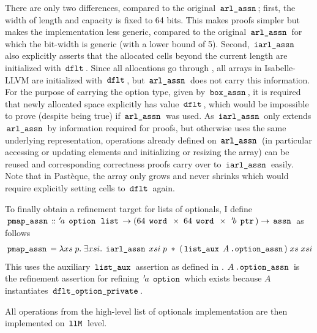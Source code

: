 There are only two differences, compared to the original $\,\text{\ttfamily arl\_assn}\,$; first, the width of length and capacity is fixed to 64 bits.
This makes proofs simpler but makes the implementation less generic, compared to the original $\,\text{\ttfamily arl\_assn}\,$ for which the bit-width is generic (with a lower bound of 5).
Second, $\,\text{\ttfamily iarl\_assn}\,$ also explicitly asserts that the allocated cells beyond the current length are initialized with $\,\text{\ttfamily dflt}\,$.
Since all allocations go through , all arrays in Isabelle-LLVM are initialized with $\,\text{\ttfamily dflt}\,$, but $\,\text{\ttfamily arl\_assn}\,$ does not carry this information.
For the purpose of carrying the option type, given by $\,\text{\ttfamily box\_assn}\,$, it is required that newly allocated space explicitly has value $\,\text{\ttfamily dflt}\,$, which would be impossible to prove (despite being true) if $\,\text{\ttfamily arl\_assn}\,$ was used.
As $\,\text{\ttfamily iarl\_assn}\,$ only extends $\,\text{\ttfamily arl\_assn}\,$ by information required for proofs, but otherwise uses the same underlying representation, operations already defined on $\,\text{\ttfamily arl\_assn}\,$ (in particular accessing or updating elements and initializing or resizing the array) can be reused and corresponding correctness proofs carry over to $\,\text{\ttfamily iarl\_assn}\,$ easily.
Note that in Pastèque, the array only grows and never shrinks which would require explicitly setting cells to $\,\text{\ttfamily dflt}\,$ again.

To finally obtain a refinement target for lists of optionals, I define $\,\text{\ttfamily pmap\_assn}\, \mathrel{\mathord{:}\mkern-1.2mu\mathord{:}} {\mskip2mu '\mskip-2mua} \; \,\text{\ttfamily option}\, \; \,\text{\ttfamily list}\, \rightarrow (64 \; \,\text{\ttfamily word}\, \; \times \; 64 \; \,\text{\ttfamily word}\, \; \times \; {\mskip2mu '\mskip-2mub} \; \,\text{\ttfamily ptr}\,) \rightarrow \,\text{\ttfamily assn}\,$ as follows
\begin{gather*}
	\,\text{\ttfamily pmap\_assn}\, = \lambda xs \; p. \; \exists xsi. \; \,\text{\ttfamily iarl\_assn}\, \; xsi \; p \; \ast \; (\,\text{\ttfamily list\_aux}\, \; A\,\text{\ttfamily .option\_assn}\,) \; xs \; xsi
\end{gather*}
This uses the auxiliary $\,\text{\ttfamily list\_aux}\,$ assertion as defined in .
$A\,\text{\ttfamily .option\_assn}\,$ is the refinement assertion for refining ${\mskip2mu '\mskip-2mua} \; \,\text{\ttfamily option}\,$ which exists because $A$ instantiates $\,\text{\ttfamily dflt\_option\_private}\,$.

All operations from the high-level list of optionals implementation are then implemented on $\,\text{\ttfamily llM}\,$ level.

